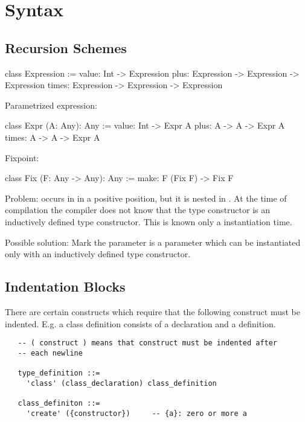 \section{Syntax}


\subsection{Recursion Schemes}

\begin{alba}
    class Expression :=
        value: Int -> Expression
        plus:  Expression -> Expression -> Expression
        times: Expression -> Expression -> Expression
\end{alba}



\noindent Parametrized expression:

\begin{alba}
    class Expr (A: Any): Any :=
        value: Int -> Expr A
        plus:  A -> A -> Expr A
        times: A -> A -> Expr A
\end{alba}


\noindent Fixpoint:

\begin{alba}
    class Fix (F: Any -> Any): Any :=
        make: F (Fix F) -> Fix F
\end{alba}
%
Problem:  occurs in  in a positive position, but it is
nested in . At the time of compilation the compiler does not know that
the type constructor  is an inductively defined type constructor. This
is known only a instantiation time.

Possible solution: Mark the parameter  is a parameter which can be
instantiated only with an inductively defined type constructor.


\begin{alba}
\end{alba}




\subsection{Indentation Blocks}

There are certain constructs which require that the following construct must
be indented. E.g. a class definition consists of a declaration and a
definition.

{\small
\begin{verbatim}
   -- ( construct ) means that construct must be indented after
   -- each newline

   type_definition ::=
     'class' (class_declaration) class_definition

   class_definiton ::=
     'create' ({constructor})     -- {a}: zero or more a
\end{verbatim}
}


